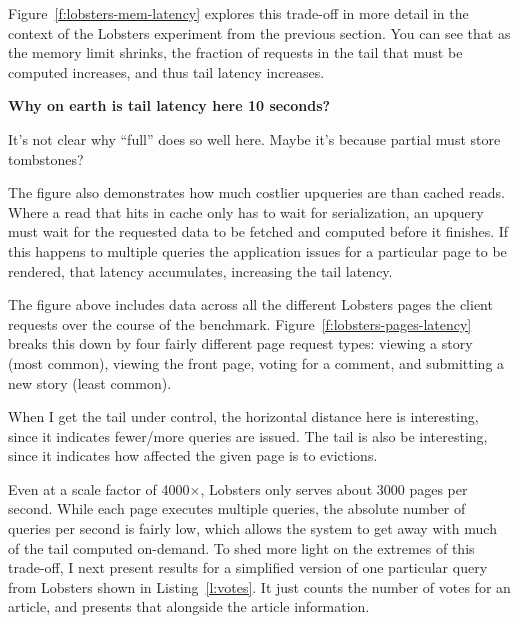 Figure~\ref{f:lobsters-mem-latency} explores this trade-off in more detail in
the context of the Lobsters experiment from the previous section. You can see
that as the memory limit shrinks, the fraction of requests in the tail that must
be computed increases, and thus tail latency increases.

\begin{inprogress}
  \textbf{Why on earth is tail latency here 10 seconds?}
\end{inprogress}

\begin{inprogress}
  It's not clear why ``full'' does so well here.
  Maybe it's because partial must store tombstones?
\end{inprogress}

The figure also demonstrates how much costlier upqueries are than cached
reads. Where a read that hits in cache only has to wait for serialization, an
upquery must wait for the requested data to be fetched and computed before it
finishes. If this happens to multiple queries the application issues for a
particular page to be rendered, that latency accumulates, increasing the tail
latency.

The figure above includes data across all the different Lobsters pages the
client requests over the course of the benchmark.
Figure~\ref{f:lobsters-pages-latency} breaks this down by four fairly
different page request types: viewing a story (most common), viewing the front
page, voting for a comment, and submitting a new story (least common).

\begin{inprogress}
  When I get the tail under control, the horizontal distance here is
  interesting, since it indicates fewer/more queries are issued. The tail is
  also be interesting, since it indicates how affected the given page is to
  evictions.
\end{inprogress}

Even at a scale factor of 4000$\times$, Lobsters only serves about 3000 pages
per second. While each page executes multiple queries, the absolute number of
queries per second is fairly low, which allows the system to get away with much
of the tail computed on-demand. To shed more light on the extremes of this
trade-off, I next present results for a simplified version of one particular
query from Lobsters shown in Listing~\ref{l:votes}. It just counts the number of
votes for an article, and presents that alongside the article information.

